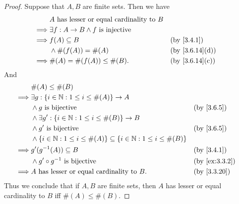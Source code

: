 \begin{proof}
  Suppose that \(A, B\) are finite sets.
  Then we have
  \begin{align*}
             & A \text{ has lesser or equal cardinality to } B                                    \\
    \implies & \exists f : A \to B \land f \text{ is injective}                                   \\
    \implies & f(A) \subseteq B                                 &  & \by{3.4.1}                   \\
             & \land \#(f(A)) = \#(A)                           &  & \text{(by \cref{3.6.14}(d))} \\
    \implies & \#(A) = \#(f(A)) \leq \#(B).                     &  & \text{(by \cref{3.6.14}(c))}
  \end{align*}
  And
  \begin{align*}
             & \#(A) \leq \#(B)                                                                                             \\
    \implies & \exists g : \set{i \in \N : 1 \leq i \leq \#(A)} \to A                                                       \\
             & \land g \text{ is bijective}                                                              &  & \by{3.6.5}    \\
             & \land \exists g' : \set{i \in \N : 1 \leq i \leq \#(B)} \to B                                                \\
             & \land g' \text{ is bijective}                                                             &  & \by{3.6.5}    \\
             & \land \set{i \in \N : 1 \leq i \leq \#(A)} \subseteq \set{i \in \N : 1 \leq i \leq \#(B)}                    \\
    \implies & g'(g^{-1}(A)) \subseteq B                                                                 &  & \by{3.4.1}    \\
             & \land g' \circ g^{-1} \text{ is bijective}                                                &  & \by{ex:3.3.2} \\
    \implies & A \text{ has lesser or equal cardinality to } B.                                          &  & \by{3.3.20}
  \end{align*}
  Thus we conclude that if \(A, B\) are finite sets, then \(A\) has lesser or equal cardinality to \(B\) iff \(\#(A) \leq \#(B)\).
\end{proof}

